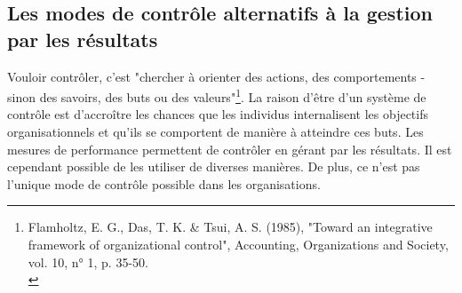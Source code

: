 \documentclass{tufte-handout}
\begin{document}
\subsection{Les modes de contrôle alternatifs à la gestion par les résultats}
\label{sec:org16d992d}
Vouloir contrôler, c'est "chercher à orienter des actions, des comportements - sinon des savoirs, des buts ou des valeurs"\footnote{Flamholtz, E. G., Das, T. K. \& Tsui, A. S. (1985), "Toward an integrative framework of organizational control", Accounting, Organizations and Society, vol. 10, n° 1, p. 35-50.\\}. La raison d'être d'un système de contrôle est d'accroître les chances que les individus internalisent les objectifs organisationnels et qu'ils se comportent de manière à atteindre ces buts. Les mesures de performance permettent de contrôler en gérant par les résultats. Il est cependant possible de les utiliser de diverses manières. De plus, ce n'est pas l'unique mode de contrôle possible dans les organisations.\\
\end{document}
